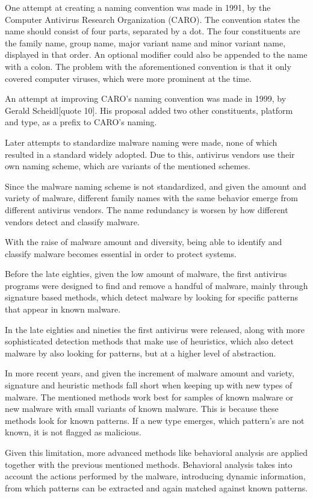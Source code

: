 \documentclass{llncs}
\begin{document}
One attempt at creating a naming convention was made in 1991, by the Computer Antivirus Research Organization (CARO). The convention states the name should consist of four parts, separated by a dot. The four constituents are the family name, group name, major variant name and minor variant name, displayed in that order. An optional modifier could also be appended to the name with a colon. The problem with the aforementioned convention is that it only covered computer viruses, which were more prominent at the time.

An attempt at improving CARO's naming convention was made in 1999, by Gerald Scheidl[quote 10]. His proposal added two other constituents, platform and type, as a prefix to CARO's naming.

Later attempts to standardize malware naming were made, none of which resulted in a standard widely adopted. Due to this, antivirus vendors use their own naming scheme, which are variants of the mentioned schemes.

Since the malware naming scheme is not standardized, and given the amount and variety of malware, different family names with the same behavior emerge from different antivirus vendors. The name redundancy is worsen by how different vendors detect and classify malware.

With the raise of malware amount and diversity, being able to identify and classify malware becomes essential in order to protect systems.

Before the late eighties, given the low amount of malware, the first antivirus programs were designed to find and remove a handful of malware, mainly through signature based methods, which detect malware by looking for specific patterns that appear in known malware.

In the late eighties and nineties the first antivirus were released, along with more sophisticated detection methods that make use of heuristics, which also detect malware by also looking for patterns, but at a higher level of abstraction.

In more recent years, and given the increment of malware amount and variety, signature and heuristic methods fall short when keeping up with new types of malware. The mentioned methods work best for samples of known malware or new malware with small variants of known malware. This is because these methods look for known patterns. If a new type emerges, which pattern's are not known, it is not flagged as malicious.

Given this limitation, more advanced methods like behavioral analysis are applied together with the previous mentioned methods. Behavioral analysis takes into account the actions performed by the malware, introducing dynamic information, from which patterns can be extracted and again matched against known patterns.
\end{document}
